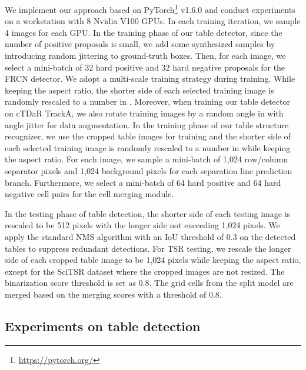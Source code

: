 \documentclass[final,3p,times,twocolumn]{elsarticle}
\begin{document}
We implement our approach based on PyTorch\footnote{\url{https://pytorch.org/}} v1.6.0 and conduct experiments on a workstation with 8 Nvidia V100 GPUs. In each training iteration, we sample 4 images for each GPU. In the training phase of our table detector, since the number of positive proposals is small, we add some synthesized samples by introducing random jittering to ground-truth boxes. Then, for each image, we select a mini-batch of 32 hard positive and 32 hard negative proposals for the FRCN detector. We adopt a multi-scale training strategy during training. While keeping the aspect ratio, the shorter side of each selected training image is randomly rescaled to a number in . Moreover, when training our table detector on cTDaR TrackA, we also rotate training images by a random angle in  with  angle jitter for data augmentation. In the training phase of our table structure recognizer, we use the cropped table images for training and the shorter side of each selected training image is randomly rescaled to a number in  while keeping the aspect ratio. For each image, we sample a mini-batch of 1,024 row/column separator pixels and 1,024 background pixels for each separation line prediction branch. Furthermore, we select a mini-batch of 64 hard positive and 64 hard negative cell pairs for the cell merging module.  

In the testing phase of table detection, the shorter side of each testing image is rescaled to be 512 pixels with the longer side not exceeding 1,024 pixels. {\color{black}{We set the number of selected corners (top-) as 100 with a corner score threshold  as 0.3.}} We apply the standard NMS algorithm with an IoU threshold of 0.3 on the detected tables to suppress redundant detections. For TSR testing, we rescale the longer side of each cropped table image to be 1,024 pixels while keeping the aspect ratio, except for the SciTSR dataset where the cropped images are not resized. The binarization score threshold  is set as 0.8. The grid cells from the split model are merged based on the merging scores with a threshold of 0.8. {\color{black}{Abovedmentioned hyper-parameters are tuned on our in-house dataset, and we directly apply them to other datasets without further tuning.}}

\subsection{Experiments on table detection}
\label{subsec:exp_TD}
\end{document}
